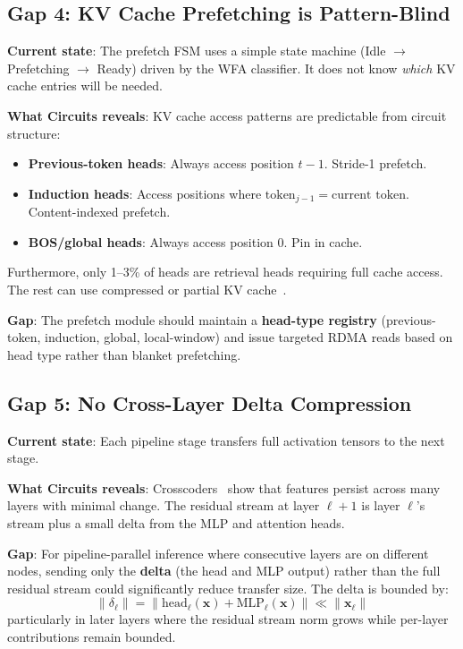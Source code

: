 \documentclass[11pt,letterpaper]{article}
\begin{document}
\subsection{Gap 4: KV Cache Prefetching is Pattern-Blind}

\textbf{Current state}: The prefetch FSM uses a simple state machine (Idle $\to$ Prefetching $\to$ Ready) driven by the WFA classifier. It does not know \emph{which} KV cache entries will be needed.

\textbf{What Circuits reveals}: KV cache access patterns are predictable from circuit structure:
\begin{itemize}
    \item \textbf{Previous-token heads}: Always access position $t-1$. Stride-1 prefetch.
    \item \textbf{Induction heads}: Access positions where $\text{token}_{j-1} = \text{current token}$. Content-indexed prefetch.
    \item \textbf{BOS/global heads}: Always access position 0. Pin in cache.
\end{itemize}

Furthermore, only 1--3\% of heads are retrieval heads requiring full cache access. The rest can use compressed or partial KV cache~\cite{olsson2022induction}.

\textbf{Gap}: The prefetch module should maintain a \textbf{head-type registry} (previous-token, induction, global, local-window) and issue targeted RDMA reads based on head type rather than blanket prefetching.

\subsection{Gap 5: No Cross-Layer Delta Compression}

\textbf{Current state}: Each pipeline stage transfers full activation tensors to the next stage.

\textbf{What Circuits reveals}: Crosscoders~\cite{anthropic2024crosscoders} show that features persist across many layers with minimal change. The residual stream at layer $\ell+1$ is layer $\ell$'s stream plus a small delta from the MLP and attention heads.

\textbf{Gap}: For pipeline-parallel inference where consecutive layers are on different nodes, sending only the \textbf{delta} (the head and MLP output) rather than the full residual stream could significantly reduce transfer size. The delta is bounded by:
\begin{equation}
    \|\delta_\ell\| = \|\text{head}_\ell(\mathbf{x}) + \text{MLP}_\ell(\mathbf{x})\| \ll \|\mathbf{x}_\ell\|
\end{equation}
particularly in later layers where the residual stream norm grows while per-layer contributions remain bounded.
\end{document}
